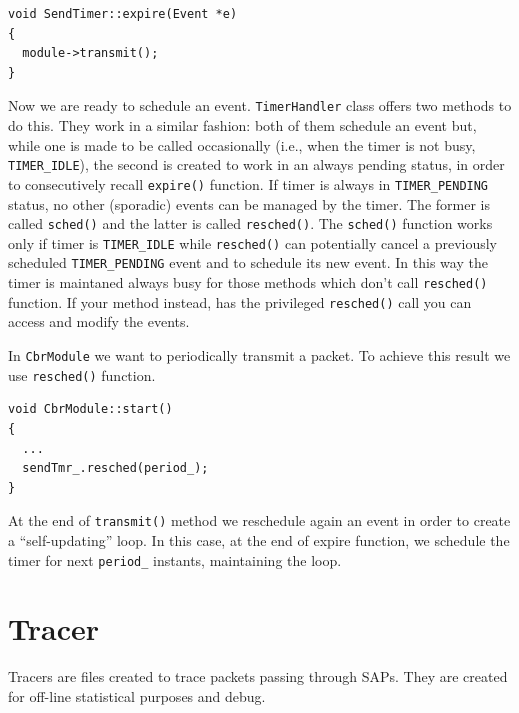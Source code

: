 \documentclass[a4paper,10pt]{article}
\begin{document}
\begin{verbatim}
void SendTimer::expire(Event *e)
{
  module->transmit();
}
\end{verbatim}

Now we are ready to schedule an event. \verb=TimerHandler= class offers two methods to do this. They work in a similar fashion: both of them schedule an event but, while one is made to be called occasionally (i.e., when the timer is not busy, \verb-TIMER_IDLE-), the second is created to work in an always pending status, in order to consecutively recall \verb=expire()= function. If timer is always in \verb=TIMER_PENDING= status, no other (sporadic) events can be managed by the timer. The former is called \verb=sched()= and the latter is called \verb=resched()=. The \verb-sched()- function works only if timer is \verb-TIMER_IDLE- while \verb-resched()- can potentially cancel a previously scheduled \verb-TIMER_PENDING- event and to schedule its new event. In this way the timer is maintaned always busy for those methods which don't call \verb-resched()- function. If your method instead, has the privileged \verb=resched()= call you can access and modify the events.

In \verb=CbrModule= we want to periodically transmit a packet. To achieve this result we use \verb=resched()= function.

\begin{verbatim}
void CbrModule::start()
{
  ...
  sendTmr_.resched(period_);
}
\end{verbatim}

At the end of \verb=transmit()= method we reschedule again an event in order to create a ``self-updating'' loop. In this case, at the end of expire function, we schedule the timer for next \verb=period_= instants, maintaining the loop.

\section{Tracer}

Tracers are files created to trace packets passing through SAPs. They are created for off-line statistical purposes and debug.
\end{document}
